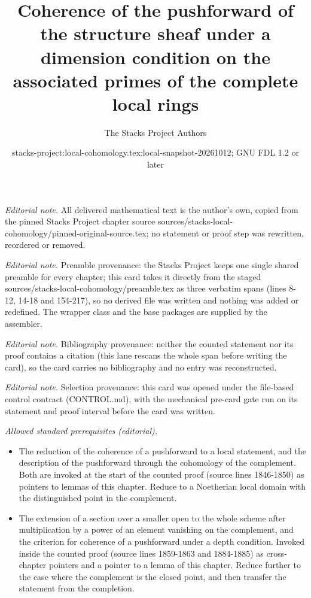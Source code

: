 \documentclass[10pt,a4paper]{amsart}
\title{Coherence of the pushforward of the structure sheaf under a dimension condition on the associated primes of the complete local rings}
\author{The Stacks Project Authors}
\date{stacks-project:local-cohomology.tex:local-snapshot-20261012; GNU FDL 1.2 or later}
\theoremstyle{plain}
\theoremstyle{definition}
\theoremstyle{remark}
\numberwithin{equation}{subsection}
\begin{document}
\maketitle
\noindent\textit{Editorial note.} All delivered mathematical text is the author's own, copied from the pinned Stacks Project chapter source sources/stacks-local-cohomology/pinned-original-source.tex; no statement or proof step was rewritten, reordered or removed.\par\medskip
\noindent\textit{Editorial note.} Preamble provenance: the Stacks Project keeps one single shared preamble for every chapter; this card takes it directly from the staged sources/stacks-local-cohomology/preamble.tex as three verbatim spans (lines 8-12, 14-18 and 154-217), so no derived file was written and nothing was added or redefined. The wrapper class and the base packages are supplied by the assembler.\par\medskip
\noindent\textit{Editorial note.} Bibliography provenance: neither the counted statement nor its proof contains a citation (this lane rescans the whole span before writing the card), so the card carries no bibliography and no entry was reconstructed.\par\medskip
\noindent\textit{Editorial note.} Selection provenance: this card was opened under the file-based control contract (CONTROL.md), with the mechanical pre-card gate run on its statement and proof interval before the card was written.\par\medskip
\noindent\textit{Allowed standard prerequisites (editorial).}\begin{itemize}
\item The reduction of the coherence of a pushforward to a local statement, and the description of the pushforward through the cohomology of the complement. Both are invoked at the start of the counted proof (source lines 1846-1850) as pointers to lemmas of this chapter. Reduce to a Noetherian local domain with the distinguished point in the complement.
\item The extension of a section over a smaller open to the whole scheme after multiplication by a power of an element vanishing on the complement, and the criterion for coherence of a pushforward under a depth condition. Invoked inside the counted proof (source lines 1859-1863 and 1884-1885) as cross-chapter pointers and a pointer to a lemma of this chapter. Reduce further to the case where the complement is the closed point, and then transfer the statement from the completion.
\end{itemize}\medskip
\end{document}
